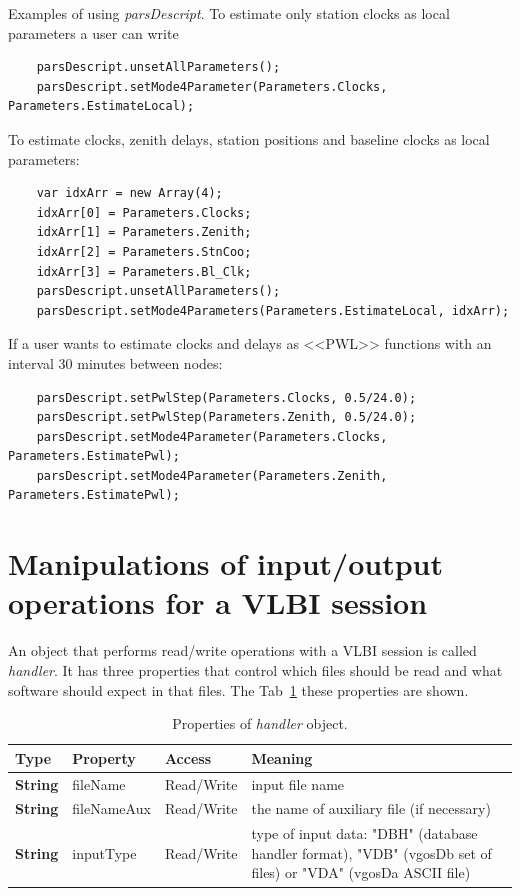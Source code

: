 \documentclass [10pt,letterpaper]{report}
\begin{document}
Examples of using {\sl parsDescript}. To estimate only station clocks as local
parameters a user can write
{\small\begin{verbatim}
    parsDescript.unsetAllParameters();
    parsDescript.setMode4Parameter(Parameters.Clocks, Parameters.EstimateLocal);
\end{verbatim}}
\noindent
To estimate clocks, zenith delays, station positions and baseline clocks as
local parameters:
{\small\begin{verbatim}
    var idxArr = new Array(4);
    idxArr[0] = Parameters.Clocks;
    idxArr[1] = Parameters.Zenith;
    idxArr[2] = Parameters.StnCoo;
    idxArr[3] = Parameters.Bl_Clk;
    parsDescript.unsetAllParameters();
    parsDescript.setMode4Parameters(Parameters.EstimateLocal, idxArr);
\end{verbatim}}
\noindent
If a user wants to estimate clocks and delays as <<PWL>> functions with an
interval 30 minutes between nodes:
{\small\begin{verbatim}
    parsDescript.setPwlStep(Parameters.Clocks, 0.5/24.0);
    parsDescript.setPwlStep(Parameters.Zenith, 0.5/24.0);
    parsDescript.setMode4Parameter(Parameters.Clocks, Parameters.EstimatePwl);
    parsDescript.setMode4Parameter(Parameters.Zenith, Parameters.EstimatePwl);
\end{verbatim}}



\section{Manipulations of input/output operations for a VLBI session}
\label{section-scripting-session-handler}
An object that performs read/write operations with a VLBI session is called {\sl handler}.
It has three properties that control which files should be read and what software should
expect in that files. The Tab~\ref{tab-scr-handler-properties} these properties are shown.

\begin{table}[htb]
\centering
\footnotesize
\begin{tabular}{lllp{}}
\hline
Type & Property & Access & Meaning\\
\hline
  {\bf String} & fileName    & Read/Write & input file name\\
  {\bf String} & fileNameAux & Read/Write & the name of auxiliary file (if necessary)\\
  {\bf String} & inputType   & Read/Write & type of input data: "DBH" (database handler format),
                               "VDB" (vgosDb set of files) or "VDA" (vgosDa ASCII file)\\
\hline
\end{tabular}
\caption{Properties of {\sl handler} object.}
\label{tab-scr-handler-properties}
\end{table}
\end{document}

